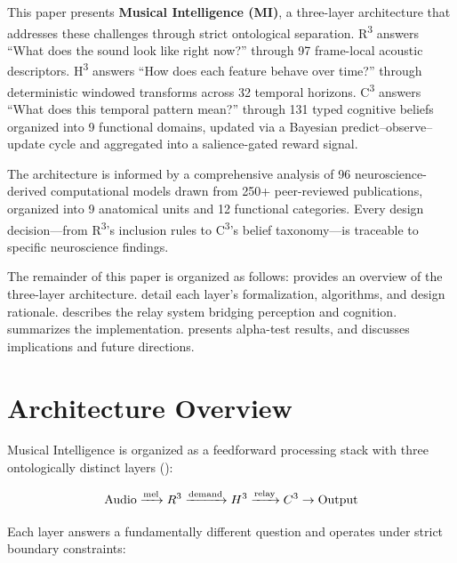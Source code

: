 \documentclass[10pt,twocolumn]{article}
\newcommand{\Rcube}{R\textsuperscript{3}}
\newcommand{\Hcube}{H\textsuperscript{3}}
\newcommand{\Ccube}{C\textsuperscript{3}}
\begin{document}
This paper presents \textbf{Musical Intelligence (MI)}, a three-layer architecture that addresses these challenges through strict ontological separation.
\Rcube{} answers ``What does the sound look like right now?'' through 97 frame-local acoustic descriptors.
\Hcube{} answers ``How does each feature behave over time?'' through deterministic windowed transforms across 32 temporal horizons.
\Ccube{} answers ``What does this temporal pattern mean?'' through 131 typed cognitive beliefs organized into 9 functional domains, updated via a Bayesian predict--observe--update cycle and aggregated into a salience-gated reward signal.

The architecture is informed by a comprehensive analysis of 96 neuroscience-derived computational models drawn from 250+ peer-reviewed publications, organized into 9 anatomical units and 12 functional categories.
Every design decision---from \Rcube{}'s inclusion rules to \Ccube{}'s belief taxonomy---is traceable to specific neuroscience findings.

The remainder of this paper is organized as follows:
 provides an overview of the three-layer architecture.
 detail each layer's formalization, algorithms, and design rationale.
 describes the relay system bridging perception and cognition.
 summarizes the implementation.
 presents alpha-test results, and  discusses implications and future directions.

\section{Architecture Overview}
\label{sec:architecture}

Musical Intelligence is organized as a feedforward processing stack with three ontologically distinct layers ():

\begin{equation}
\text{Audio} \xrightarrow{\text{mel}} \Rcube \xrightarrow{\text{demand}} \Hcube \xrightarrow{\text{relay}} \Ccube \rightarrow \text{Output}
\label{eq:pipeline}
\end{equation}

Each layer answers a fundamentally different question and operates under strict boundary constraints:
\end{document}
